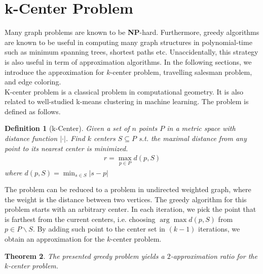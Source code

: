 \documentclass[11pt,psfig,times]{article}
\newcommand*{\NP}{\textbf{NP}}
\newtheorem{theorem}{Theorem}
\newtheorem{definition}[theorem]{Definition}
\begin{document}
\section{k-Center Problem}
Many graph problems are known to be \NP-hard. Furthermore, greedy algorithms are known to be useful in computing 
many graph structures in polynomial-time such as minimum spanning trees, shortest paths etc. Unaccidentally, 
this strategy is also useful in term of approximation algorithms. 
In the following sections, we introduce the approximation for $k$-center problem, travelling salesman problem, and edge coloring. \\
K-center problem is a classical problem in computational geometry. It is also related to well-studied k-means clustering in machine learning. 
The problem is defined as follows.
\begin{definition}[k-Center]
    Given a set of $n$ points $P$ in a metric space with distance function $|\cdot|$. 
    Find $k$ centers $S \subseteq P$ s.t. the maximal distance from any point to its nearest center is minimized.
    \begin{align*}
        r = \max_{p \in P} d(p, S)
    \end{align*}
    where $d(p, S) = \min_{s \in S} |s - p| $
\end{definition}
The problem can be reduced to a problem in undirected weighted graph, where the weight is the distance between two vertices. 
The greedy algorithm for this problem starts with an arbitrary center. In each iteration, we pick the point that 
is farthest from the current centers, i.e. choosing $\arg \max d(p, S)$ from $p \in P \backslash S$. 
By adding such point to the center set in $(k-1)$ iterations, we obtain an approximation for the $k$-center problem.
\begin{theorem}
    The presented greedy problem yields a $2$-approximation ratio for the $k$-center problem.
\end{theorem}
\end{document}
